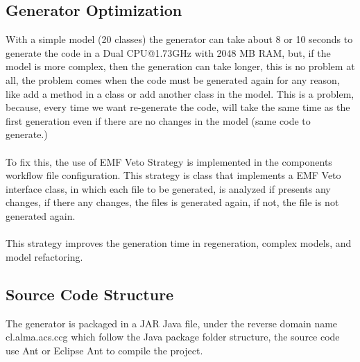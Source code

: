 \subsection{Generator Optimization}
With a simple model (20 classes) the generator can take about 8 or 10 seconds
to generate the code in a Dual CPU@1.73GHz with 2048 MB RAM, but, if the model
is more complex, then the generation can take longer, this is no problem at
all, the problem comes when the code must be generated again for any
reason, like add a method in a class or add another class in the model. This is
a problem, because, every time we want re-generate the code, will take the same
time as the first generation even if there are no changes in the model (same
code to generate.)\\
\\
To fix this, the use of EMF Veto Strategy is implemented in the components
workflow file configuration. This strategy is class that implements a EMF Veto
interface class, in which each file to be generated, is analyzed if presents any
changes, if there any changes, the files is generated again, if not, the file
is not generated again.\\
\\
This strategy improves the generation time in regeneration, complex models,
and model refactoring.

\subsection{Source Code Structure}
The generator is packaged in a JAR Java file, under the reverse domain name
cl.alma.acs.ccg which follow the Java package folder structure, the source code
use Ant or Eclipse Ant to compile the project.

